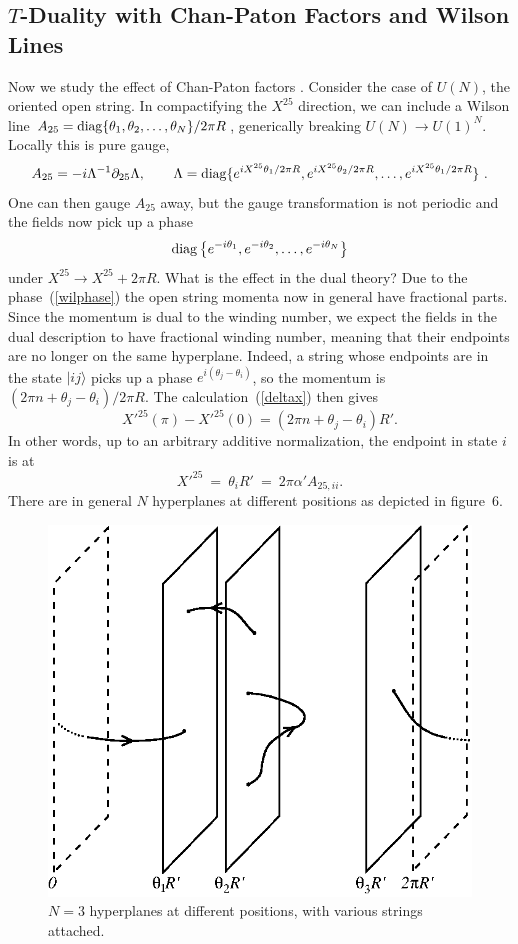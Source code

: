 \documentclass[12pt]{article}
\def\be{\begin{equation}}
\def\ee{\end{equation}}
\def\ap{\alpha'}
\begin{document}
\subsection{$T$-Duality with Chan-Paton Factors and Wilson Lines}

Now we study the effect of
Chan-Paton factors \cite{joecomb}.
Consider the case of $U(N)$, the oriented open string. In compactifying the
$X^{25}$ direction, we can include a Wilson line $A_{25}={\rm
diag}\{\theta_1,\theta_2,\ldots,\theta_N\}/2\pi R$, 
generically breaking $U(N) \to U(1)^N$.  Locally this is pure gauge,
\be
A_{25} = -i\Lambda^{-1}\partial_{25}\Lambda,\qquad
\Lambda={\rm diag}\{e^{ i X^{25}\theta_1/2\pi R},e^{ i X^{25}\theta_2/2\pi
R}, \ldots , e^{ i X^{25}\theta_1/2\pi R} \}\ .
\ee
One can then gauge $A_{25}$
away, but the gauge transformation is not periodic and the fields now pick up
a phase
\be
{\rm diag}\left\{ e^{-i\theta_1}, e^{-i\theta_2}, \ldots, e^{-i\theta_N}
\right\} \label{wilphase}
\ee
under $X^{25} \to X^{25} + 2\pi R$.  What is the effect in the dual theory?
Due to the phase~(\ref{wilphase}) the open string momenta now in general have
fractional parts.  Since the momentum is dual to the winding number, we
expect the fields in the dual description to have fractional winding
number, meaning that their endpoints are no longer on the same hyperplane.  Indeed,
a string whose endpoints are in the state $|ij\rangle$ picks up a phase
$e^{i(\theta_j - \theta_i)}$, so the momentum is $(2\pi n + \theta_j -
\theta_i)/2\pi R$.  The calculation~(\ref{deltax}) then gives
\be
X'^{25}(\pi) - X'^{25}(0) = (2\pi n + \theta_j - \theta_i) R'.
\ee
In other words, up to an arbitrary additive normalization, the endpoint in
state $i$ is at 
\be
X'^{25}\ =\ \theta_i R' \ =\ 2\pi\ap A_{25,ii}. \label{dualpos}
\ee  
There are in general $N$
hyperplanes at different positions as depicted in figure~6.
\begin{figure}
\begin{center}
\leavevmode
\includegraphics{branes.eps}
\end{center}
\caption[]{$N=3$ hyperplanes at different positions, with various strings
attached.}
\end{figure}
\end{document}

